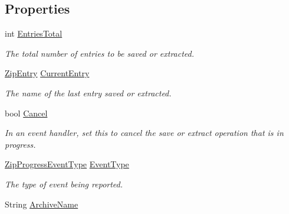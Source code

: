 \subsection*{Properties}
\begin{DoxyCompactItemize}
\item 
int \mbox{\hyperlink{class_super_tiled2_unity_1_1_ionic_1_1_zip_1_1_zip_progress_event_args_a196333fb229706bb2c521eae0c867dd9}{Entries\+Total}}
\begin{DoxyCompactList}\small\item\em The total number of entries to be saved or extracted. \end{DoxyCompactList}\item 
\mbox{\hyperlink{class_super_tiled2_unity_1_1_ionic_1_1_zip_1_1_zip_entry}{Zip\+Entry}} \mbox{\hyperlink{class_super_tiled2_unity_1_1_ionic_1_1_zip_1_1_zip_progress_event_args_aa2cf173f83591b5b52e15ca4c9d34129}{Current\+Entry}}
\begin{DoxyCompactList}\small\item\em The name of the last entry saved or extracted. \end{DoxyCompactList}\item 
bool \mbox{\hyperlink{class_super_tiled2_unity_1_1_ionic_1_1_zip_1_1_zip_progress_event_args_a91248747aca5704f3cab69af3a289028}{Cancel}}
\begin{DoxyCompactList}\small\item\em In an event handler, set this to cancel the save or extract operation that is in progress. \end{DoxyCompactList}\item 
\mbox{\hyperlink{namespace_super_tiled2_unity_1_1_ionic_1_1_zip_a6584db8196e626ddfc455e74d31a841f}{Zip\+Progress\+Event\+Type}} \mbox{\hyperlink{class_super_tiled2_unity_1_1_ionic_1_1_zip_1_1_zip_progress_event_args_a6d4aebfeab7f649887bf1994b5258a15}{Event\+Type}}
\begin{DoxyCompactList}\small\item\em The type of event being reported. \end{DoxyCompactList}\item 
String \mbox{\hyperlink{class_super_tiled2_unity_1_1_ionic_1_1_zip_1_1_zip_progress_event_args_a08044c6164aecbece74b2ca903694072}{Archive\+Name}}

\end{DoxyCompactItemize}
